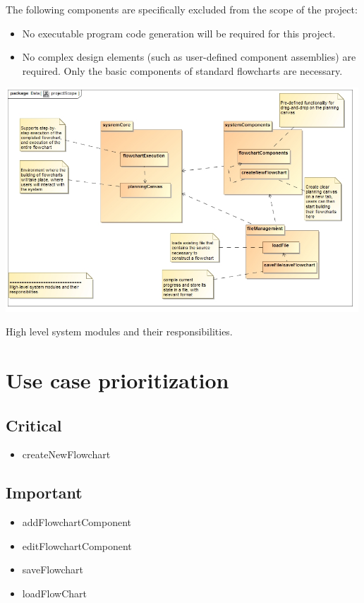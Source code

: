 \documentclass[11pt,a4paper,titlepage]{article}
\begin{document}
The following components are specifically excluded from the scope of the project:

\begin{itemize}
\item No executable program code generation will be required for this project.
\item No complex design elements (such as user-defined component assemblies) are required.
Only the basic components of standard flowcharts are necessary.\\

\end{itemize}

\includegraphics[width=500px]{projectScope.jpg}
\centerline{High level system modules and their responsibilities.}


\newpage	
\section{Use case prioritization}
\subsection{Critical}
\begin{itemize}
  \item createNewFlowchart
\end{itemize}
\subsection{Important}
\begin{itemize}
  \item addFlowchartComponent
  \item editFlowchartComponent
  \item saveFlowchart
  \item loadFlowChart
\end{itemize}
\end{document}
